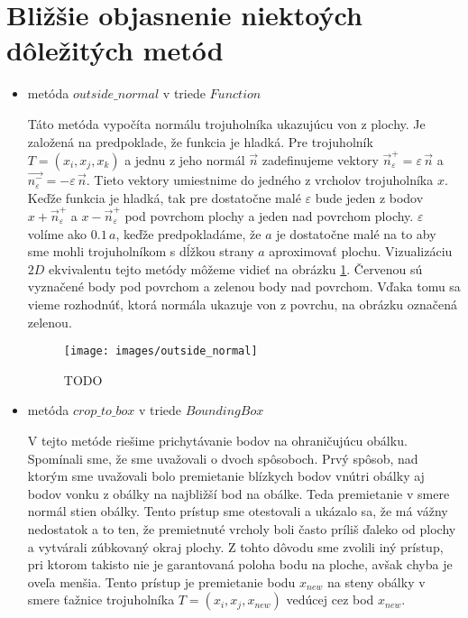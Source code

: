 \section{Bližšie objasnenie niektoých dôležitých metód}
\label{kap:important_methods}
\begin{itemize}
    \item{
        metóda $outside\_normal$ v triede $Function$
        
        Táto metóda vypočíta normálu trojuholníka ukazujúcu von z plochy.
        Je založená na predpoklade, že funkcia je hladká. Pre trojuholník
        $T = (x_i, x_j, x_k)$ a jednu z jeho normál $\overrightarrow{n}$
        zadefinujeme vektory $\overrightarrow{n}_{\varepsilon}^+ = \varepsilon \, \overrightarrow{n}$
        a $\overrightarrow{n_{\varepsilon}^-} = - \varepsilon \, \overrightarrow{n}$.
        Tieto vektory umiestnime do jedného z vrcholov trojuholníka $x$.
        Keďže funkcia je hladká, tak pre dostatočne malé $\varepsilon$ bude jeden z
        bodov $x + \overrightarrow{n}_{\varepsilon}^+$ a $x - \overrightarrow{n}_{\varepsilon}^+$ 
        pod povrchom plochy a jeden nad povrchom plochy. 
        $\varepsilon$ volíme ako $0.1 \, a$, keďže predpokladáme, že $a$ je dostatočne 
        malé na to aby sme mohli trojuholníkom s dĺžkou strany $a$ aproximovať plochu.
        Vizualizáciu $2D$ ekvivalentu tejto metódy môžeme vidieť na obrázku \ref{obr:outside_normal}.
        Červenou sú vyznačené body pod povrchom a zelenou body nad povrchom. Vďaka tomu sa vieme 
        rozhodnúť, ktorá normála ukazuje von z povrchu, na obrázku označená zelenou.

        \begin{figure}
            \centerline{\texttt{[image: images/outside\_normal]}}
            \caption[TODO]{TODO}
            \label{obr:outside_normal}
        \end{figure}
    }
    \item{

        metóda $crop\_to\_box$ v triede $BoundingBox$
        
        V tejto metóde riešime prichytávanie bodov na ohraničujúcu obálku.
        Spomínali sme, že sme uvažovali o dvoch spôsoboch.
        Prvý spôsob, nad ktorým sme uvažovali bolo premietanie blízkych bodov vnútri obálky aj 
        bodov vonku z obálky na najbližší bod na obálke. Teda premietanie v smere normál stien obálky.
        Tento prístup sme otestovali a ukázalo sa, že má vážny nedostatok a to ten, že premietnuté 
        vrcholy boli často príliš ďaleko od plochy a vytvárali zúbkovaný okraj plochy. Z tohto dôvodu
        sme zvolili iný prístup, pri ktorom takisto nie je garantovaná poloha bodu na ploche, avšak 
        chyba je oveľa menšia. Tento prístup je premietanie bodu $x_{new}$ na steny obálky v smere 
        ťažnice trojuholníka $T = (x_i, x_j, x_{new})$ vedúcej cez bod $x_{new}$.

}
\end{itemize}
